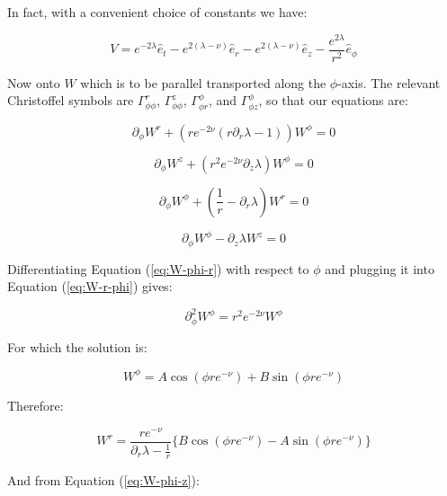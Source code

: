 \documentclass{article}
\begin{document}
In fact, with a convenient choice of constants we have:

\begin{equation}
V=e^{-2\lambda}\hat{e}_{t}-e^{2(\lambda-\nu)}\hat{e}_{r}-e^{2(\lambda-\nu)}\hat{e}_{z}-\frac{e^{2\lambda}}{r^{2}}\hat{e}_{\phi}
\end{equation}

Now onto $W$ which is to be parallel transported along the $\phi$-axis. The relevant Christoffel symbols are $\Gamma^{r}_{\phi\phi}$, $\Gamma^{z}_{\phi\phi}$, $\Gamma^{\phi}_{\phi r}$, and $\Gamma^{\phi}_{\phi z}$, so that our equations are:

\begin{equation}
\partial_{\phi}W^{r}+\left(re^{-2\nu}\left(r\partial_{r}\lambda-1\right)\right)W^{\phi}=0\label{eq:W-r-phi}
\end{equation}

\begin{equation}
\partial_{\phi}W^{z}+\left(r^{2}e^{-2\nu}\partial_{z}\lambda\right)W^{\phi}=0
\end{equation}

\begin{equation}
\partial_{\phi}W^{\phi}+\left(\frac{1}{r}-\partial_{r}\lambda\right)W^{r}=0\label{eq:W-phi-r}
\end{equation}

\begin{equation}
\partial_{\phi}W^{\phi}-\partial_{z}\lambda W^{z}=0\label{eq:W-phi-z}
\end{equation}

Differentiating Equation (\ref{eq:W-phi-r}) with respect to $\phi$ and plugging it into Equation (\ref{eq:W-r-phi}) gives:

\begin{equation}
\partial^{2}_{\phi}W^{\phi}=r^{2}e^{-2\nu}W^{\phi}
\end{equation}

For which the solution is:

\begin{equation}
W^{\phi}=A\cos(\phi re^{-\nu})+B\sin(\phi re^{-\nu})
\end{equation}

Therefore:

\begin{equation}
W^{r}=\frac{re^{-\nu}}{\partial_{r}\lambda-\frac{1}{r}}\{B\cos(\phi re^{-\nu})-A\sin(\phi re^{-\nu})\}
\end{equation}

And from Equation (\ref{eq:W-phi-z}):
\end{document}
